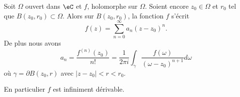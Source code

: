 \begin{theorem}     \label{ThomcPOdd}
    Soit \( \Omega\) ouvert dans \( \eC\) et \( f\), holomorphe sur \( \Omega\). Soient encore \( z_0\in \Omega\) et \( r_0\) tel que \( B(z_0,r_0)\subset \Omega\). Alors sur \( B(z_0,r_0)\), la fonction \( f\) s'écrit
    \begin{equation}
        f(z)=\sum_{n=0}^{\infty}a_n(z-z_0)^n.
    \end{equation}
    De plus nous avons
    \begin{equation}
        a_n=\frac{ f^{(n)}(z_0) }{ n! }=\frac{1}{ 2\pi i }\int_{\gamma}\frac{ f(\omega) }{ (\omega-z_0)^{n+1} }d\omega
    \end{equation}
    où \( \gamma=\partial B(z_0,r)\) avec \( | z-z_0 |<r<r_0\).

    En particulier \( f\) est infiniment dérivable.
\end{theorem}

